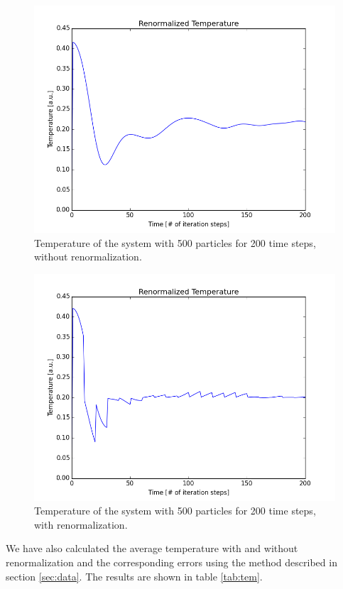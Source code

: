 \documentclass[a4paper,twoside,12pt]{article}
\begin{document}
\begin{figure}[h]
\centering
\includegraphics[scale=0.5]{figures/temperature_500.png}
\caption{Temperature of the system with 500 particles for 200 time steps, without renormalization.}
\label{fig:tem}
\end{figure}

\begin{figure}[h]
\centering
\includegraphics[scale=0.5]{figures/temperatures_renormalized_500.png}
\caption{Temperature of the system with 500 particles for 200 time steps, with renormalization.}
\label{fig:tem_ren}
\end{figure}

\noindent We have also calculated the average temperature with and without renormalization and the corresponding errors using the method described in section \ref{sec:data}. The results are shown in table \ref{tab:tem}.
\end{document}
